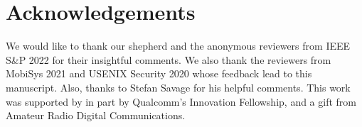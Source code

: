 
\section{Acknowledgements}
\label{sec:acknowledgement}

We would like to thank our shepherd and the anonymous reviewers from IEEE
S\&P 2022 for their insightful comments. We also thank the reviewers from MobiSys
2021 and USENIX Security 2020 whose feedback lead to this manuscript.
Also, thanks to Stefan Savage for his helpful comments.
%
This work was supported by in part by Qualcomm's Innovation
Fellowship, and a gift from Amateur Radio Digital Communications.
